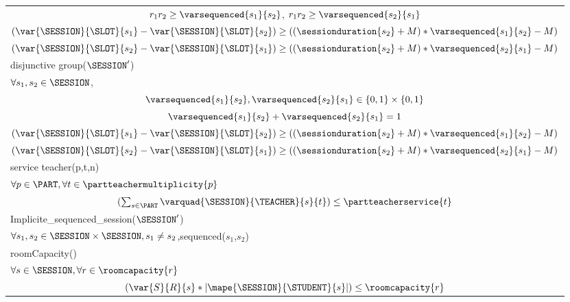 \begin{table}[!h]
\begin{tabular}{|lr|}
         \multicolumn{2}{|c|}{$r_1r_2 \geq \varsequenced{s_1}{s_2} $, $r_1r_2 \geq \varsequenced{s_2}{s_1} $}\\
         \multicolumn{2}{|c|}{$(\var{\SESSION}{\SLOT}{s_1} - \var{\SESSION}{\SLOT}{s_2}) \geq ((\sessionduration{s_2}+M)*\varsequenced{s_1}{s_2} - M )$ }\\
         \multicolumn{2}{|c|}{$(\var{\SESSION}{\SLOT}{s_2} - \var{\SESSION}{\SLOT}{s_1}) \geq ((\sessionduration{s_2}+M)*\varsequenced{s_2}{s_1} - M )$}\\
         \hline
         disjunctive group($\SESSION'$) &  \\
         $\forall s_1,s_2 \in \SESSION $, &\\
     \multicolumn{2}{|c|}{$ \varsequenced{s_1}{s_2}, \varsequenced{s_2}{s_1}\in \{0,1\} \times\{0,1\}$}\\
         \multicolumn{2}{|c|}{ $\varsequenced{s_1}{s_2} + \varsequenced{s_2}{s_1} = 1$}\\
         \multicolumn{2}{|c|}{ $(\var{\SESSION}{\SLOT}{s_1} - \var{\SESSION}{\SLOT}{s_2}) \geq ((\sessionduration{s_2}+M)*\varsequenced{s_1}{s_2} - M )$} \\
         \multicolumn{2}{|c|}{$(\var{\SESSION}{\SLOT}{s_2} - \var{\SESSION}{\SLOT}{s_1}) \geq ((\sessionduration{s_2}+M)*\varsequenced{s_2}{s_1} - M )$}\\
         \hline
         service teacher(p,t,n) &  \\
         $\forall p \in \PART, \forall t \in \partteachermultiplicity{p} $&\\
         \multicolumn{2}{|c|}{ $(\sum_{s\in \PART}\varquad{\SESSION}{\TEACHER}{s}{t}) \leq \partteacherservice{t}$ }\\
         \hline                  
         Implicite\_sequenced\_session($\SESSION'$)  & \\
         $ \forall s_1,s_2 \in \SESSION \times \SESSION,  s_1 \neq s_2 $,sequenced($s_1$,$s_2$) & \\
         \hline
         roomCapacity() & \\
         $\forall s \in \SESSION, \forall r \in  \roomcapacity{r}$&\\ 
         \multicolumn{2}{|c|}{$(\var{S}{R}{s}*|\mape{\SESSION}{\STUDENT}{s}|) \leq \roomcapacity{r} $}\\
         \hline
    \end{tabular}
    \label{tab:mip-constraint}
\end{table}




